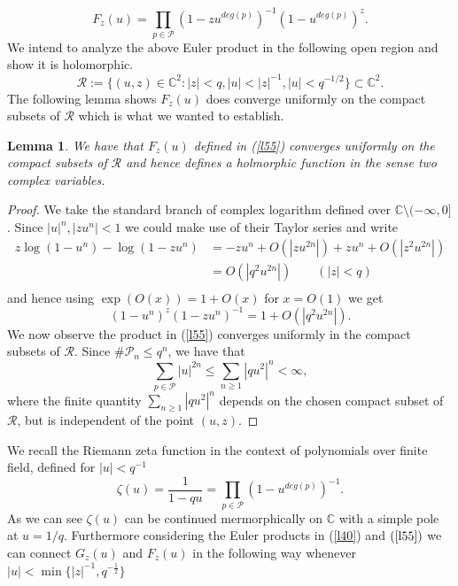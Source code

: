 \documentclass[12pt]{amsart}
\numberwithin{equation}{section}
\newtheorem{Lemma}[theorem]{Lemma}
\theoremstyle{remark}
\theoremstyle{remark}
\theoremstyle{definition}
\begin{document}
\begin{equation}\label{l55}
F_z(u)=\displaystyle\prod\limits_{p\in\mathcal{P}}\left(1-zu^{deg(p)} \right)^{-1}\left(1-u^{deg(p)} \right)^z.
\end{equation}
We intend to analyze the above Euler product in the following open region and show it is holomorphic.
$$\mathcal{R}:=\Big \{(u,z)\in\mathbb{C}^2:|z|< q,|u|<|z|^{-1},|u|<q^{-1/2}\Big\}\subset\mathbb{C}^2.$$
The following lemma shows $F_z(u)$ does converge uniformly on the compact subsets of $\mathcal{R}$ which is what we wanted to establish.
\begin{Lemma}\label{l56}
We have that $F_z(u)$ defined in (\ref{l55}) converges uniformly on the compact subsets of $\mathcal{R}$ and hence defines a holmorphic function in the sense two complex variables.
\end{Lemma}
\begin{proof}
We take the standard branch of complex logarithm defined over $\mathbb{C}\setminus(-\infty,0]$. Since $|u|^n,|zu^n|<1$ we could make use of their Taylor series and write
\begin{align}
\nonumber
z\log(1-u^n)-\log(1-zu^n)  &= -zu^n+O\left(\left|zu^{2n}\right|\right)+zu^n+O\left(\left|z^2u^{2n}\right|\right)\\
\nonumber
&= O\left(\left|q^2u^{2n}\right|\right)\qquad \left(|z|<q\right)\\
\end{align}
and hence using $\exp(O(x))=1+O(x)$ for $x=O(1)$ we get
$$(1-u^n)^z(1-zu^n)^{-1}=1+O\left(\left|q^2u^{2n}\right|\right).$$
We now observe the product in (\ref{l55}) converges uniformly in the compact subsets of $\mathcal{R}$. Since $\#\mathcal{P}_n\leqslant q^n$, we have that $$\displaystyle\sum\limits_{p\in\mathcal{P}}|u|^{2n}\leqslant \displaystyle\sum\limits_{n\geqslant 1}|qu^2|^{n}<\infty,$$
where the finite quantity $\sum\limits_{n\geqslant 1}|qu^2|^{n}$ depends on the chosen compact subset of $\mathcal{R}$, but is independent of the point $(u,z)$.
\end{proof}
We recall the Riemann zeta function in the context of polynomials over finite field, defined for $|u|<q^{-1}$
$$\zeta(u)=\dfrac{1}{1-qu}=\displaystyle\prod_{p\in\mathcal{P}}\left(1-u^{deg(p)}\right)^{-1}.$$
As we can see $\zeta(u)$ can be continued mermorphically on $\mathbb{C}$ with a simple pole at $u=1/q$. Furthermore considering the Euler products in (\ref{l40}) and $(\ref{l55})$ we can connect $G_z(u)$ and $F_z(u)$ in the following way whenever $|u|<\min \big\{ |z|^{-1},q^{-\frac 12}\big\}$
\end{document}
